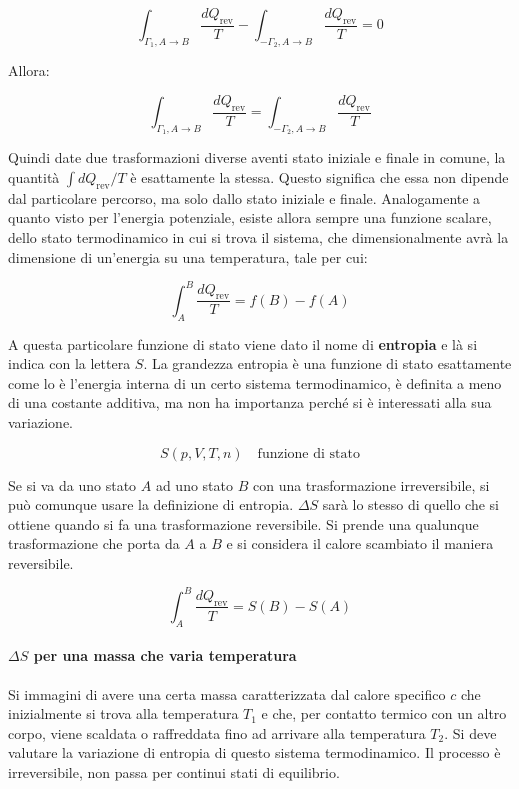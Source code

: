 \[
	\int_{\Gamma_1, A\to B} \frac{dQ_{\text{rev} } }{T} - \int_{-\Gamma_2, A\to B} \frac{dQ_{\text{rev} } }{T} = 0
\]

Allora:

\[
	\int_{\Gamma_1, A\to B} \frac{dQ_{\text{rev} } }{T} = \int_{-\Gamma_2, A\to B} \frac{dQ_{\text{rev} } }{T}
\]

Quindi date due trasformazioni diverse aventi stato iniziale e finale in comune, la quantità $\int dQ_\text{rev}/T$ è esattamente la stessa. Questo significa che essa non dipende dal particolare percorso, ma solo dallo stato iniziale e finale. Analogamente a quanto visto per l'energia potenziale, esiste allora sempre una funzione scalare, dello stato termodinamico in cui si trova il sistema, che dimensionalmente avrà la dimensione di un'energia su una temperatura, tale per cui:

\[
	\int_A^B \frac{dQ_{\text{rev} } }{T} = f(B) - f(A)
\]

A questa particolare funzione di stato viene dato il nome di \textbf{entropia} e là si indica con la lettera $S$.
La grandezza entropia è una funzione di stato esattamente come lo è l'energia interna di un certo sistema termodinamico, è definita a meno di una costante additiva, ma non ha importanza perché si è interessati alla sua variazione.

\[
	S(p,V,T,n) \quad \text{funzione di stato}
\]

Se si va da uno stato $A$ ad uno stato $B$ con una trasformazione irreversibile, si può comunque usare la definizione di entropia. $\Delta S$ sarà lo stesso di quello che si ottiene quando si fa una trasformazione reversibile. Si prende una qualunque trasformazione che porta da $A$ a $B$ e si considera il calore scambiato il maniera reversibile.

\[
	\int_A^B \frac{dQ_{\text{rev} } }{T} = S(B) - S(A)
\]

\paragraph{$\Delta S$ per una massa che varia temperatura} Si immagini di avere una certa massa caratterizzata dal calore specifico $c$ che inizialmente si trova alla temperatura $T_1$ e che, per contatto termico con un altro corpo, viene scaldata o raffreddata fino ad arrivare alla temperatura $T_2$. Si deve valutare la variazione di entropia di questo sistema termodinamico. Il processo è irreversibile, non passa per continui stati di equilibrio.

